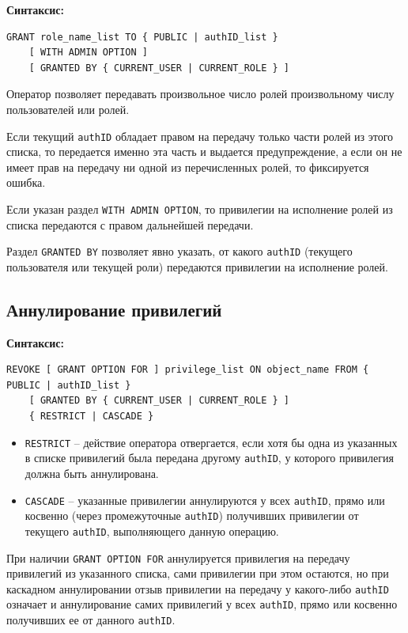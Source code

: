 \documentclass[a4paper,12pt]{article}
\begin{document}
\textbf{Синтаксис:}
\begin{verbatim}
GRANT role_name_list TO { PUBLIC | authID_list }
    [ WITH ADMIN OPTION ]
    [ GRANTED BY { CURRENT_USER | CURRENT_ROLE } ]
\end{verbatim}

Оператор позволяет передавать произвольное число ролей произвольному числу пользователей или ролей.

Если текущий \texttt{authID} обладает правом на передачу только части ролей из этого списка, то передается именно эта часть и выдается предупреждение, а если он не имеет прав на передачу ни одной из перечисленных ролей, то фиксируется ошибка.

Если указан раздел \texttt{WITH ADMIN OPTION}, то привилегии на исполнение ролей из списка передаются с правом дальнейшей передачи.

Раздел \texttt{GRANTED BY} позволяет явно указать, от какого \texttt{authID} (текущего пользователя или текущей роли) передаются привилегии на исполнение ролей.

\subsection{Аннулирование привилегий}

\textbf{Синтаксис:}
\begin{verbatim}
REVOKE [ GRANT OPTION FOR ] privilege_list ON object_name FROM { PUBLIC | authID_list }
    [ GRANTED BY { CURRENT_USER | CURRENT_ROLE } ]
    { RESTRICT | CASCADE }
\end{verbatim}

\begin{itemize}
    \item \texttt{RESTRICT} – действие оператора отвергается, если хотя бы одна из указанных в списке привилегий была передана другому \texttt{authID}, у которого привилегия должна быть аннулирована.
    \item \texttt{CASCADE} – указанные привилегии аннулируются у всех \texttt{authID}, прямо или косвенно (через промежуточные \texttt{authID}) получивших привилегии от текущего \texttt{authID}, выполняющего данную операцию.
\end{itemize}

При наличии \texttt{GRANT OPTION FOR} аннулируется привилегия на передачу привилегий из указанного списка, сами привилегии при этом остаются, но при каскадном аннулировании отзыв привилегии на передачу у какого-либо \texttt{authID} означает и аннулирование самих привилегий у всех \texttt{authID}, прямо или косвенно получивших ее от данного \texttt{authID}.
\end{document}
